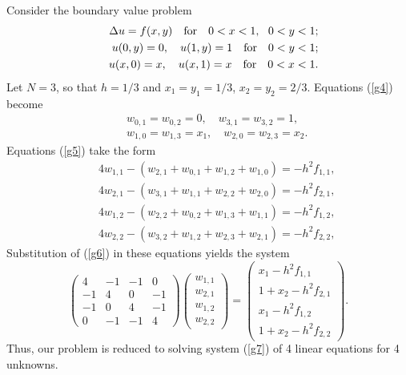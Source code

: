  
\begin{example}
Consider the boundary value problem
\begin{eqnarray}
&&\Delta u = f(x,y) \quad {\rm for} \quad 0< x< 1, \ \ 0< y< 1;  \nonumber \\
&&u(0,y)=0, \quad u(1,y)=1 \quad {\rm for} \quad 0< y< 1;  \nonumber \\
&&u(x,0)=x, \quad u(x,1)=x \quad {\rm for} \quad 0< x< 1.  \nonumber
\end{eqnarray}
Let $N=3$, so that $h=1/3$ and $x_{1}=y_{1}=1/3$, $x_{2}=y_{2}=2/3$.
Equations (\ref{g4}) become
\begin{eqnarray}
&&w_{0,1}=w_{0,2}=0, \quad w_{3,1}=w_{3,2}=1, \nonumber \\
&&w_{1,0}=w_{1,3}=x_{1}, \quad w_{2,0}=w_{2,3}=x_{2}. \label{g6}
\end{eqnarray}
Equations (\ref{g5}) take the form
\begin{eqnarray}
&&4w_{1,1}-\left(w_{2,1}+w_{0,1}+w_{1,2}+w_{1,0}\right)=-h^2f_{1,1}, \nonumber \\
&&4w_{2,1}-\left(w_{3,1}+w_{1,1}+w_{2,2}+w_{2,0}\right)=-h^2f_{2,1}, \nonumber \\
&&4w_{1,2}-\left(w_{2,2}+w_{0,2}+w_{1,3}+w_{1,1}\right)=-h^2f_{1,2}, \nonumber \\
&&4w_{2,2}-\left(w_{3,2}+w_{1,2}+w_{2,3}+w_{2,1}\right)=-h^2f_{2,2}, \nonumber
\end{eqnarray}
Substitution of (\ref{g6}) in these equations yields the system
\begin{equation}
\left(
\begin{array}{cccc}
4 &-1 &-1 &0 \\
-1 &4 &0 &-1 \\
-1 &0 &4 &-1 \\
0 &-1 &-1 &4
\end{array}\right)
\left(
\begin{array}{c}
w_{1,1} \\
w_{2,1} \\
w_{1,2} \\
w_{2,2}
\end{array}\right)=
\left(
\begin{array}{c}
x_{1}-h^2f_{1,1} \\
1+x_{2}-h^2f_{2,1} \\
x_{1}-h^2f_{1,2} \\
1+x_{2}-h^2f_{2,2}
\end{array}\right). \label{g7}
\end{equation}
Thus, our problem is reduced to solving system (\ref{g7})
of 4 linear equations for 4 unknowns.
\end{example}
 

